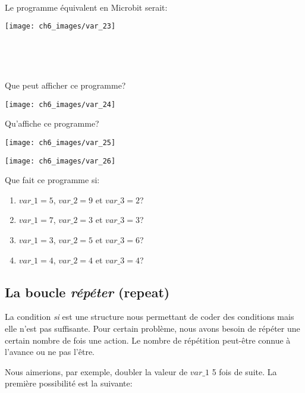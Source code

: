 \documentclass[11pt, a4paper]{book}
\begin{document}
\ 

Le programme équivalent en Microbit serait:

\begin{center}
\texttt{[image: ch6\_images/var\_23]}
\end{center}

\

\ 

\begin{exercice}
Que peut afficher ce programme?
\begin{center}
\texttt{[image: ch6\_images/var\_24]}
\end{center}
\end{exercice}

\begin{exercice}
Qu'affiche ce programme?
\begin{center}
\texttt{[image: ch6\_images/var\_25]}
\end{center}
\end{exercice}

 

\newpage


\begin{exercice}
\begin{center}
\texttt{[image: ch6\_images/var\_26]}
\end{center}
Que fait ce programme si:
\begin{enumerate}
	\item $var\_1=5$, $var\_2=9$  et $var\_3=2$? 
	\item $var\_1=7$, $var\_2=3$  et $var\_3=3$?
	\item $var\_1=3$, $var\_2=5$  et $var\_3=6$? 
	\item $var\_1=4$, $var\_2=4$  et $var\_3=4$?  
\end{enumerate}
\end{exercice}


\subsection{La boucle {\it répéter} (repeat)}

La condition {\it si} est une structure  nous permettant de coder des conditions mais elle n'est pas suffisante. Pour certain problème, nous avons besoin de répéter une certain nombre de fois une action. Le nombre de répétition peut-être connue à l'avance ou ne pas l'être.

Nous aimerions, par exemple, doubler la valeur de $var\_1$ 5 fois de suite. La première possibilité est la suivante:
\end{document}
